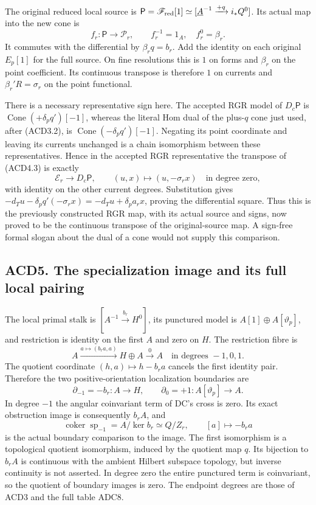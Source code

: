 The original reduced local source is
\(\mathsf P=\mathscr F_{\rm red}[1]\simeq[\underline A^{-1}\xrightarrow{+q}i_*Q^0]\).
Its actual map into the new cone is \[
f_r:\mathsf P\to\mathscr P_r,\qquad f_r^{-1}=1_A,\quad
f_r^0=\beta_r.
\tag{ACD4.3}
\] It commutes with the differential by \(\beta_rq=b_r\). Add the
identity on each original \(E_p[1]\) for the full source. On fine
resolutions this is \(1\) on forms and \(\beta_r\) on the point
coefficient. Its continuous transpose is therefore \(1\) on currents and
\(\beta_r'R=\sigma_r\) on the point functional.

There is a necessary representative sign here. The accepted RGR model of
\(D_c\mathsf P\) is \(\operatorname{Cone}(+\delta_pq')[-1]\), whereas
the literal Hom dual of the plus-\(q\) cone just used, after (ACD3.2),
is \(\operatorname{Cone}(-\delta_pq')[-1]\). Negating its point
coordinate and leaving its currents unchanged is a chain isomorphism
between these representatives. Hence in the accepted RGR representative
the transpose of (ACD4.3) is exactly \[
\mathscr E_r\longrightarrow D_c\mathsf P,\qquad
(u,x)\longmapsto(u,-\sigma_rx)
\quad\text{in degree zero},
\tag{ACD4.4}
\] with identity on the other current degrees. Substitution gives
\(-d_Tu-\delta_pq'(-\sigma_rx)=-d_Tu+\delta_pa_rx\), proving the
differential square. Thus this is the previously constructed RGR map,
with its actual source and signs, now proved to be the continuous
transpose of the original-source map. A sign-free formal slogan about
the dual of a cone would not supply this comparison.

\subsection{ACD5. The specialization image and its full local
pairing}\label{acd5.-the-specialization-image-and-its-full-local-pairing}

The local primal stalk is \([A^{-1}\xrightarrow{b_r}H^0]\), its
punctured model is \(A[1]\oplus A[\vartheta_p]\), and restriction is
identity on the first \(A\) and zero on \(H\). The restriction fibre is
\[
A\xrightarrow{a\mapsto(b_ra,a)}H\oplus A\xrightarrow{0}A
\quad\text{in degrees }-1,0,1.
\tag{ACD5.1}
\] The quotient coordinate \((h,a)\mapsto h-b_ra\) cancels the first
identity pair. Therefore the two positive-orientation localization
boundaries are \[
\partial_{-1}=-b_r:A\to H,\qquad
\partial_0=+1:A[\vartheta_p]\to A.
\tag{ACD5.2}
\] In degree \(-1\) the angular coinvariant term of DC's cross is zero.
Its exact obstruction image is consequently \(b_rA\), and \[
\operatorname{coker}\operatorname{sp}_{-1}
=A/\ker b_r\simeq Q/Z_r,
\qquad [a]\longmapsto-b_ra
\tag{ACD5.3}
\] is the actual boundary comparison to the image. The first isomorphism
is a topological quotient isomorphism, induced by the quotient map
\(q\). Its bijection to \(b_rA\) is continuous with the ambient Hilbert
subspace topology, but inverse continuity is not asserted. In degree
zero the entire punctured term is coinvariant, so the quotient of
boundary images is zero. The endpoint degrees are those of ACD3 and the
full table ADC8.

